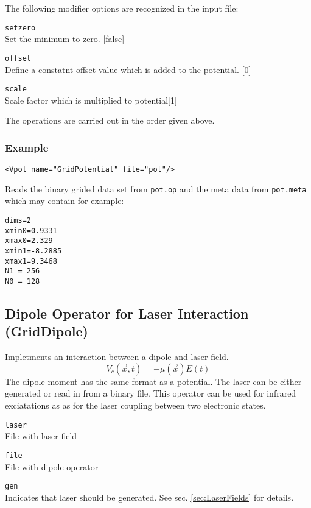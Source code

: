 \documentclass[a4paper,12pt]{scrbook}
\newcommand{\option}[2]{\item \texttt{#1}\\ #2}
\begin{document}
The following modifier options are recognized in the input file:
\begin{options}
 \option{setzero}{Set the minimum to zero. [false]}
 \option{offset}{Define a constatnt offset value which is added to the potential. [0]}
 \option{scale}{Scale factor which is multiplied to potential[1]}
\end{options}
The operations are carried out in the order given above.

\subsubsection*{Example}
\begin{verbatim}
<Vpot name="GridPotential" file="pot"/>
\end{verbatim}
Reads the binary grided data set from \verb|pot.op| and the meta data from \verb|pot.meta| which may contain for example:
\begin{verbatim}
dims=2
xmin0=0.9331
xmax0=2.329
xmin1=-8.2885
xmax1=9.3468
N1 = 256
N0 = 128
\end{verbatim}

\subsection{Dipole Operator for Laser Interaction (GridDipole)}
Impletments an interaction between a dipole and laser field.
\begin{equation}
 V_c(\vec{x},t) = -\mu(\vec{x}) E(t)
\end{equation}
The dipole moment has the same format as a potential. The laser
can be either generated or read in from a binary file.
This operator can be used for infrared exciatations as as for
the laser coupling between two electronic states.

\begin{options}
 \option{laser}{File with laser field}
 \option{file}{File with dipole operator}
 \option{gen}{Indicates that laser should be generated. See sec. \ref{sec:LaserFields} for details.}
\end{options}
\end{document}
